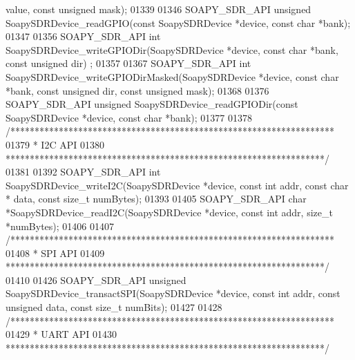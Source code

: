 \begin{DoxyCode}
      value, \textcolor{keyword}{const} \textcolor{keywordtype}{unsigned} mask);
01339 
01346 SOAPY_SDR_API \textcolor{keywordtype}{unsigned} SoapySDRDevice_readGPIO(\textcolor{keyword}{const} SoapySDRDevice *device, \textcolor{keyword}{const} \textcolor{keywordtype}{char} *bank);
01347 
01356 SOAPY_SDR_API \textcolor{keywordtype}{int} SoapySDRDevice_writeGPIODir(SoapySDRDevice *device, \textcolor{keyword}{const} \textcolor{keywordtype}{char} *bank, \textcolor{keyword}{const} \textcolor{keywordtype}{unsigned} dir)
      ;
01357 
01367 SOAPY_SDR_API \textcolor{keywordtype}{int} SoapySDRDevice_writeGPIODirMasked(SoapySDRDevice *device, \textcolor{keyword}{const} \textcolor{keywordtype}{char} *bank, \textcolor{keyword}{const} \textcolor{keywordtype}{
      unsigned} dir, \textcolor{keyword}{const} \textcolor{keywordtype}{unsigned} mask);
01368 
01376 SOAPY_SDR_API \textcolor{keywordtype}{unsigned} SoapySDRDevice_readGPIODir(\textcolor{keyword}{const} SoapySDRDevice *device, \textcolor{keyword}{const} \textcolor{keywordtype}{char} *bank);
01377 
01378 \textcolor{comment}{/*******************************************************************}
01379 \textcolor{comment}{ * I2C API}
01380 \textcolor{comment}{ ******************************************************************/}
01381 
01392 SOAPY_SDR_API \textcolor{keywordtype}{int} SoapySDRDevice_writeI2C(SoapySDRDevice *device, \textcolor{keyword}{const} \textcolor{keywordtype}{int} addr, \textcolor{keyword}{const} \textcolor{keywordtype}{char} *
      data, \textcolor{keyword}{const} \textcolor{keywordtype}{size\_t} numBytes);
01393 
01405 SOAPY_SDR_API \textcolor{keywordtype}{char} *SoapySDRDevice_readI2C(SoapySDRDevice *device, \textcolor{keyword}{const} \textcolor{keywordtype}{int} addr, \textcolor{keywordtype}{size\_t} *numBytes);
01406 
01407 \textcolor{comment}{/*******************************************************************}
01408 \textcolor{comment}{ * SPI API}
01409 \textcolor{comment}{ ******************************************************************/}
01410 
01426 SOAPY_SDR_API \textcolor{keywordtype}{unsigned} SoapySDRDevice_transactSPI(SoapySDRDevice *device, \textcolor{keyword}{const} \textcolor{keywordtype}{int} addr, \textcolor{keyword}{const} \textcolor{keywordtype}{unsigned} 
      data, \textcolor{keyword}{const} \textcolor{keywordtype}{size\_t} numBits);
01427 
01428 \textcolor{comment}{/*******************************************************************}
01429 \textcolor{comment}{ * UART API}
01430 \textcolor{comment}{ ******************************************************************/}

\end{DoxyCode}
